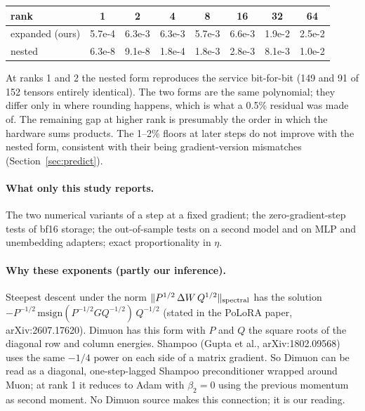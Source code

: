 \documentclass[11pt]{article}
\begin{document}
\begin{center}\small
\begin{tabular}{lccccccc}\toprule
rank & 1 & 2 & 4 & 8 & 16 & 32 & 64\\\midrule
expanded (ours) & 5.7e-4 & 6.3e-3 & 6.3e-3 & 5.7e-3 & 6.6e-3 & 1.9e-2 & 2.5e-2\\
nested & 6.3e-8 & 9.1e-8 & 1.8e-4 & 1.8e-3 & 2.8e-3 & 8.1e-3 & 1.0e-2\\\bottomrule
\end{tabular}
\end{center}
At ranks 1 and 2 the nested form reproduces the service bit-for-bit (149 and 91 of 152 tensors
entirely identical). The two forms are the same polynomial; they differ only in where rounding
happens, which is what a 0.5\% residual was made of. The remaining gap at higher rank is
presumably the order in which the hardware sums products. The 1--2\% floors at later steps do
not improve with the nested form, consistent with their being gradient-version mismatches
(Section~\ref{sec:predict}).

\paragraph{What only this study reports.} The two numerical variants of a step at a fixed
gradient; the zero-gradient-step tests of bf16 storage; the out-of-sample tests on a second
model and on MLP and unembedding adapters; exact proportionality in $\eta$.

\paragraph{Why these exponents (partly our inference).} Steepest descent under the norm
$\|P^{1/2}\,\Delta W\,Q^{1/2}\|_{\rm spectral}$ has the solution
$-P^{-1/2}\,\mathrm{msign}(P^{-1/2}GQ^{-1/2})\,Q^{-1/2}$ (stated in the PoLoRA paper,
arXiv:2607.17620). Dimuon has this form with $P$ and $Q$ the square roots of the diagonal row
and column energies. Shampoo (Gupta et al., arXiv:1802.09568) uses the same $-1/4$ power on
each side of a matrix gradient. So Dimuon can be read as a diagonal, one-step-lagged Shampoo
preconditioner wrapped around Muon; at rank 1 it reduces to Adam with $\beta_2=0$ using the
previous momentum as second moment. No Dimuon source makes this connection; it is our reading.
\end{document}
